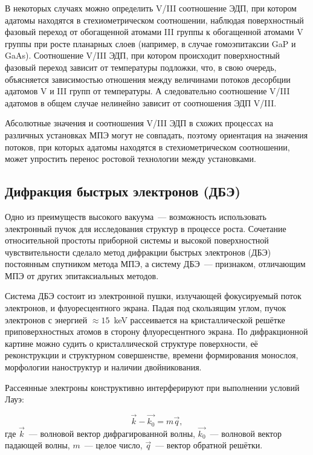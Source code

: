 В некоторых случаях можно определить V/III соотношение ЭДП, при котором адатомы находятся в стехиометрическом соотношении, наблюдая поверхностный фазовый переход от обогащенной атомами III группы к обогащенной атомами V группы при росте планарных слоев (например, в случае гомоэпитаксии GaP и GaAs). Соотношение V/III ЭДП, при котором происходит поверхностный фазовый переход зависит от температуры подложки, что, в свою очередь, объясняется зависимостью отношения между величинами потоков десорбции адатомов V и III групп от температуры. А следовательно соотношение V/III адатомов в общем случае нелинейно зависит от соотношения ЭДП V/III.

Абсолютные значения и соотношения V/III ЭДП в схожих процессах на различных установках МПЭ могут не совпадать, поэтому ориентация на значения потоков, при которых адатомы находятся в стехиометрическом соотношении, может упростить перенос ростовой технологии между установками.

\subsection{Дифракция быстрых электронов (ДБЭ)}\label{subsec:ch2/sec1/sub2}

Одно из преимуществ высокого вакуума~--- возможность использовать электронный пучок для исследования структур в процессе роста. Сочетание относительной простоты приборной системы и высокой поверхностной чувствительности сделало метод дифракции быстрых электронов (ДБЭ) постоянным спутником метода МПЭ, а систему ДБЭ~--- признаком, отличающим МПЭ от других эпитаксиальных методов.

Система ДБЭ состоит из электронной пушки, излучающей фокусируемый поток электронов, и флуоресцентного экрана. Падая под скользящим углом, пучок электронов с энергией \(\approx 15\)~\si{\kilo\electronvolt} рассеивается на кристаллической решётке приповерхностных атомов в сторону флуоресцентного экрана. По дифракционной картине можно судить о кристаллической структуре поверхности, её реконструкции и структурном совершенстве, времени формирования монослоя, морфологии наноструктур и наличии двойникования.

Рассеянные электроны конструктивно интерферируют при выполнении условий Лауэ:

\begin{equation}
	\label{eq:eq_2}
	\vec{k} - \vec{k_0} = m\vec{q},
\end{equation}
где \(\vec{k}\)~--- волновой вектор дифрагированной волны, \(\vec{k_0}\)~--- волновой вектор падающей волны, \(m\)~--- целое число, \(\vec{q}\)~--- вектор обратной решётки.

